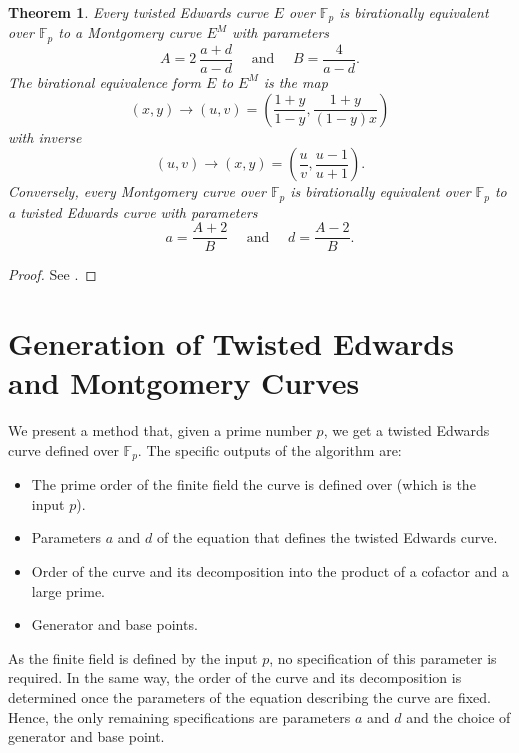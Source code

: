 \documentclass{article}
\newcommand{\Fp}{\ensuremath{\mathbb{F}_p}}
\newtheorem{thm}{Theorem}[section]
\theoremstyle{definition}
\theoremstyle{remark}
\begin{document}
\begin{spacing}{1.2}
\begin{multicols}{2}
\begin{thm} \label{thm-equiv} %
Every twisted Edwards curve $E$ over $\Fp$ %
is birationally equivalent over $\Fp$ to a Montgomery curve $E^M$ with parameters 
	$$	A =2\:\frac{a + d}{a - d} 
			\quad\text{ and }\quad 
		B = \frac{4}{a - d}.	$$ 
The birational equivalence form $E$ to $E^M$ is the map
	$$ (x,y) \to (u,v) = \left( 
								\frac{1 + y}{1 - y} , 
								\frac{1 + y}{(1 - y)x} 
						 \right) $$
with inverse %
	\begin{equation} \label{eq-mon-to-ted} 
	(u, v) \to (x, y) = \left(  
								\frac{u}{v}, 
								\frac{u - 1}{u + 1}   
						\right). 
	\end{equation}
Conversely, every Montgomery curve over $\Fp$ is birationally equivalent over $\Fp$ to a twisted Edwards curve with parameters
	$$	a = \frac{A + 2}{B} 
			\quad\text{ and }\quad 
		d = \frac{A - 2}{B}.	$$	
\end{thm}

\begin{proof}
See \cite[Thm. 3.2]{cryptoeprint:2008:013}.
\end{proof}
	

\section{Generation of Twisted Edwards and Montgomery Curves} \label{sec-gen}

We present a method that, given a prime number $p$, we get a twisted Edwards curve defined over $\Fp$. The specific outputs of the algorithm are:

\begin{itemize}
	\item The prime order of the finite field the curve is defined over (which is the input $p$).
	\item Parameters $a$ and $d$ of the equation that defines the twisted Edwards curve.
	\item Order of the curve and its decomposition into the product of a cofactor and a large prime. 
	\item Generator and base points.
\end{itemize}

As the finite field is defined by the input $p$, no specification of this parameter is required. In the same way, the order of the curve and its decomposition is determined once the parameters of the equation describing the curve are fixed. Hence, the only remaining specifications are parameters $a$ and $d$ and the choice of generator and base point. 


\end{multicols}
\end{spacing}
\end{document}
